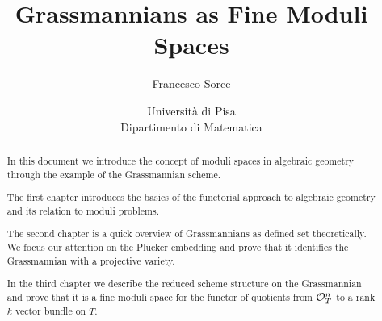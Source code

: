\documentclass[a4paper]{report}
\title{Grassmannians as Fine Moduli Spaces}
\author{Francesco Sorce}
\date{Università di Pisa\\
Dipartimento di Matematica}
\begin{document}
\maketitle

\begin{abstract}
In this document we introduce the concept of moduli spaces in algebraic geometry through the example of the Grassmannian scheme.

The first chapter introduces the basics of the functorial approach to algebraic geometry and its relation to moduli problems.

The second chapter is a quick overview of Grassmannians as defined set theoretically. We focus our attention on the Pl\"ucker embedding and prove that it identifies the Grassmannian with a projective variety.

In the third chapter we describe the reduced scheme structure on the Grassmannian and prove that it is a fine moduli space for the functor of quotients from $\mathcal{O}_T^n$ to a rank $k$ vector bundle on $T$.

\end{abstract}

\tableofcontents
\newpage










%
\end{document}
